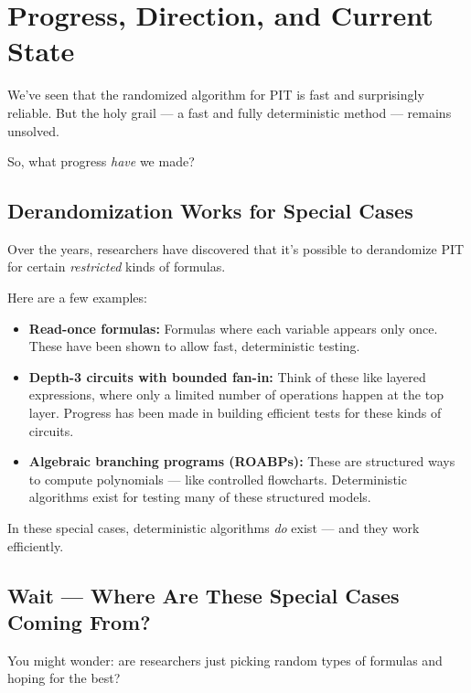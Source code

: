 \section{Progress, Direction, and Current State}

We've seen that the randomized algorithm for PIT is fast and surprisingly reliable. But the holy grail — a fast and fully deterministic method — remains unsolved.

So, what progress \textit{have} we made?

\subsection*{Derandomization Works for Special Cases}

Over the years, researchers have discovered that it's possible to derandomize PIT for certain \textit{restricted} kinds of formulas.

Here are a few examples:

\begin{itemize}
  \item \textbf{Read-once formulas:} Formulas where each variable appears only once. These have been shown to allow fast, deterministic testing.
  
  \item \textbf{Depth-3 circuits with bounded fan-in:} Think of these like layered expressions, where only a limited number of operations happen at the top layer. Progress has been made in building efficient tests for these kinds of circuits.
  
  \item \textbf{Algebraic branching programs (ROABPs):} These are structured ways to compute polynomials — like controlled flowcharts. Deterministic algorithms exist for testing many of these structured models.
\end{itemize}



In these special cases, deterministic algorithms \textit{do} exist — and they work efficiently.

\vspace{1em}

\subsection*{Wait — Where Are These Special Cases Coming From?}

You might wonder: are researchers just picking random types of formulas and hoping for the best?

